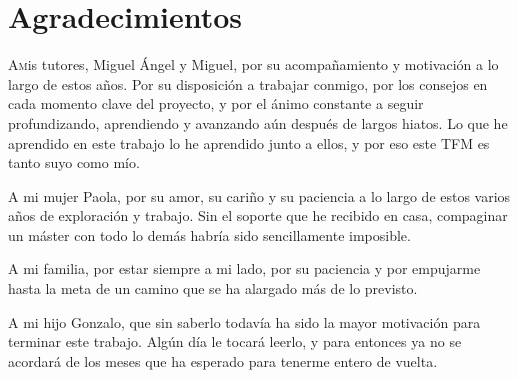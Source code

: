 \chapter*{Agradecimientos}
\pagestyle{empty}

\lettrine[lraise=-0.1, lines=2, loversize=0.25]{A} mis tutores, Miguel Ángel y Miguel, por su acompañamiento y motivación a lo largo de estos años. Por su disposición a trabajar conmigo, por los consejos en cada momento clave del proyecto, y por el ánimo constante a seguir profundizando, aprendiendo y avanzando aún después de largos hiatos. Lo que he aprendido en este trabajo lo he aprendido junto a ellos, y por eso este TFM es tanto suyo como mío.

A mi mujer Paola, por su amor, su cariño y su paciencia a lo largo de estos varios años de exploración y trabajo. Sin el soporte que he recibido en casa, compaginar un máster con todo lo demás habría sido sencillamente imposible.

A mi familia, por estar siempre a mi lado, por su paciencia y por empujarme hasta la meta de un camino que se ha alargado más de lo previsto.

A mi hijo Gonzalo, que sin saberlo todavía ha sido la mayor motivación para terminar este trabajo. Algún día le tocará leerlo, y para entonces ya no se acordará de los meses que ha esperado para tenerme entero de vuelta.

\vspace{1em}

{}%
\vspace{-.3cm}
{}%
